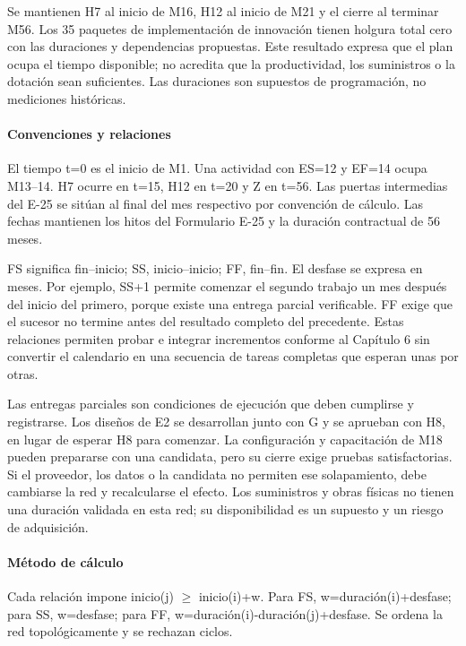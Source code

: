 Se mantienen H7 al inicio de M16, H12 al inicio de M21 y el cierre al terminar M56. Los 35 paquetes de implementación de innovación tienen holgura total cero con las duraciones y dependencias propuestas. Este resultado expresa que el plan ocupa el tiempo disponible; no acredita que la productividad, los suministros o la dotación sean suficientes. Las duraciones son supuestos de programación, no mediciones históricas.

\paragraph{Convenciones y relaciones}

El tiempo t=0 es el inicio de M1. Una actividad con ES=12 y EF=14 ocupa M13–14. H7 ocurre en t=15, H12 en t=20 y Z en t=56. Las puertas intermedias del E-25 se sitúan al final del mes respectivo por convención de cálculo. Las fechas mantienen los hitos del Formulario E-25 y la duración contractual de 56 meses.

FS significa fin–inicio; SS, inicio–inicio; FF, fin–fin. El desfase se expresa en meses. Por ejemplo, SS+1 permite comenzar el segundo trabajo un mes después del inicio del primero, porque existe una entrega parcial verificable. FF exige que el sucesor no termine antes del resultado completo del precedente. Estas relaciones permiten probar e integrar incrementos conforme al Capítulo 6 sin convertir el calendario en una secuencia de tareas completas que esperan unas por otras.

Las entregas parciales son condiciones de ejecución que deben cumplirse y registrarse. Los diseños de E2 se desarrollan junto con G y se aprueban con H8, en lugar de esperar H8 para comenzar. La configuración y capacitación de M18 pueden prepararse con una candidata, pero su cierre exige pruebas satisfactorias. Si el proveedor, los datos o la candidata no permiten ese solapamiento, debe cambiarse la red y recalcularse el efecto. Los suministros y obras físicas no tienen una duración validada en esta red; su disponibilidad es un supuesto y un riesgo de adquisición.

\paragraph{Método de cálculo}

Cada relación impone inicio(j) \(\geq\) inicio(i)+w. Para FS, w=duración(i)+desfase; para SS, w=desfase; para FF, w=duración(i)-duración(j)+desfase. Se ordena la red topológicamente y se rechazan ciclos.

